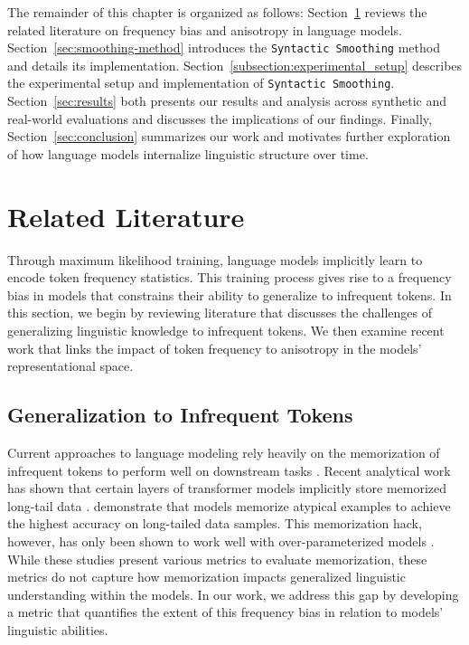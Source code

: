 The remainder of this chapter is organized as follows: Section~\ref{sec:related-literature} reviews the related literature on frequency bias and anisotropy in language models. Section~\ref{sec:smoothing-method} introduces the \texttt{Syntactic Smoothing} method and details its implementation. Section~\ref{subsection:experimental_setup} describes the experimental setup and implementation of \texttt{Syntactic Smoothing}. Section~\ref{sec:results} both presents our results and analysis across synthetic and real-world evaluations and discusses the implications of our findings. Finally, Section~\ref{sec:conclusion} summarizes our work and motivates further exploration of how language models internalize linguistic structure over time.

\section{Related Literature}
\label{sec:related-literature}

Through maximum likelihood training, language models implicitly learn to encode token frequency statistics. This training process gives rise to a frequency bias in models that constrains their ability to generalize to infrequent tokens. In this section, we begin by reviewing literature that discusses the challenges of generalizing linguistic knowledge to infrequent tokens. We then examine recent work that links the impact of token frequency to anisotropy in the models' representational space.

\subsection{Generalization to Infrequent Tokens}

Current approaches to language modeling rely heavily on the memorization of infrequent tokens to perform well on downstream tasks \citep{feldman2020does}. Recent analytical work has shown that certain layers of transformer models implicitly store memorized long-tail data \citep{haviv2023understanding, kobayashi2023transformer}. \citet{feldman2020neural} demonstrate that models memorize atypical examples to achieve the highest accuracy on long-tailed data samples. This memorization hack, however, has only been shown to work well with over-parameterized models \citep{belkin2019reconciling}. While these studies present various metrics to evaluate memorization, these metrics do not capture how memorization impacts generalized linguistic understanding within the models. In our work, we address this gap by developing a metric that quantifies the extent of this frequency bias in relation to models' linguistic abilities.

